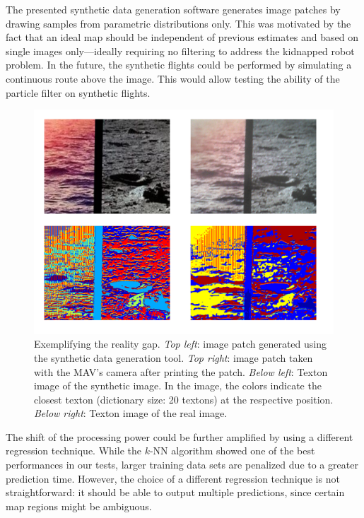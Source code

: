 \documentclass[11pt]{report}
\begin{document}
The presented synthetic data generation software generates image
patches by drawing samples from parametric distributions
only. This was motivated by the fact that an ideal map should be
independent of previous estimates and based on single images
only---ideally requiring no filtering to address the kidnapped robot
problem. In the future, the synthetic flights could be performed by
simulating a continuous route above the image. This would allow testing
the ability of the particle filter on synthetic flights.

\begin{figure}[h!]
\begin{center}
\includegraphics[width=0.65\columnwidth]{realitygap}
\caption{{\label{fig:realitygap} Exemplifying the reality
    gap. \emph{Top left}: image patch generated using the synthetic
    data generation tool. \emph{Top right}: image patch taken with the
    MAV's camera after printing the patch. \emph{Below left}: Texton
    image of the synthetic image. In the image, the colors indicate
    the closest texton (dictionary size: 20 textons) at the respective
    position. \emph{Below right}: Texton image of the real image.  }}
\end{center}
\end{figure}

The shift of the processing power could be further amplified by using
a different regression technique. While the $k$-NN algorithm showed
one of the best performances in our tests, larger training data sets
are penalized due to a greater prediction time. However, the choice of
a different regression technique is not straightforward: it should be
able to output multiple predictions, since certain map regions might
be ambiguous.

\end{document}
